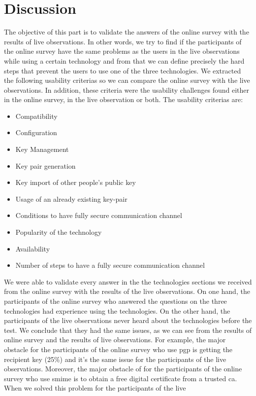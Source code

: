 \section{Discussion}
The objective of this part is to validate the answers of the online survey with the results of live observations. In other words, we try to find if the participants of the online survey have the same problems as the users in the live observations while using a certain technology and from that we can define precisely the hard steps that prevent the users to use one of the three technologies. We extracted the following usability criterias so we can compare the online survey with the live observations. In addition, these criteria were the usability challenges found either in the online survey, in the live observation or both. The usability criterias are:
\begin{itemize}
	\item Compatibility
	\item Configuration
	\item Key Management
	\item Key pair generation
	\item Key import of other people’s public key
	\item Usage of an already existing key-pair
	\item Conditions to have fully secure communication channel
	\item Popularity of the technology
	\item Availability
	\item Number of steps to have a fully secure communication channel
\end{itemize}
We were able to validate every answer in the the technologies sections we received from the online survey with the results of the live observations. On one hand, the participants of the online survey who answered the questions on the three technologies had experience using the technologies. On the other hand, the participants of the live observations never heard about the technologies before the test. We conclude that they had the same issues, as we can see from the results of online survey and the results of live observations. For example, the major obstacle
for the participants of the online survey who use \acrshort{pgp} is getting the recipient key (25\%) and it's the same issue for the participants of the live observations. Moreover, the major obstacle of for the participants of the online survey who use \acrshort{smime} is to obtain a free digital certificate from a trusted \acrlong{ca}. When we solved this problem for the participants of the live
